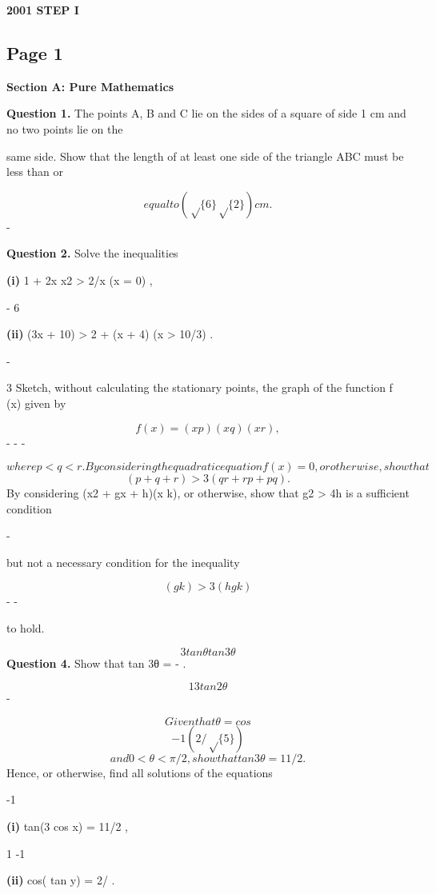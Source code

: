 \documentclass[12pt]{article}
\begin{document}
\begin{center}
{\Large \textbf{2001 STEP I}}
\end{center}

\subsection*{Page 1}
\begin{flushleft}
\bigskip\textbf{Section A: Pure Mathematics}\par
\bigskip\textbf{Question 1.} The points A, B and C lie on the sides of a square of side 1 cm and no two points lie on the\par
same side. Show that the length of at least one side of the triangle ABC must be less than or\par
\[equal to (\sqrt\{6\} \sqrt\{2\}) cm.\]
-\par
\bigskip\textbf{Question 2.} Solve the inequalities\par
\textbf{(i)} 1 + 2x x2 > 2/x (x = 0) ,\par
- 6\par
\textbf{(ii)} \sqrt(3x + 10) > 2 + \sqrt(x + 4) (x > 10/3) .\par
-\par
3 Sketch, without calculating the stationary points, the graph of the function f (x) given by\par
\[f (x) = (x p)(x q)(x r) ,\]
- - -\par
\[where p < q < r. By considering the quadratic equation f (x) = 0, or otherwise, show that\]
\[(p + q + r) > 3(qr + rp + pq) .\]
By considering (x2 + gx + h)(x k), or otherwise, show that g2 > 4h is a sufficient condition\par
-\par
but not a necessary condition for the inequality\par
\[(g k) > 3(h gk)\]
- -\par
to hold.\par
\[3 tan θ tan3 θ\]
\bigskip\textbf{Question 4.} Show that tan 3θ = - .\par
\[1 3 tan2 θ\]
-\par
\[Given that θ = cos\]
\[-1(2/\sqrt\{5\})\]
\[and 0 < θ < \pi/2, show that tan 3θ = 11/2 .\]
Hence, or otherwise, find all solutions of the equations\par
-1\par
\textbf{(i)} tan(3 cos x) = 11/2 ,\par
1 -1\par
\textbf{(ii)} cos( tan y) = 2/ .\par
\end{flushleft}
\end{document}
